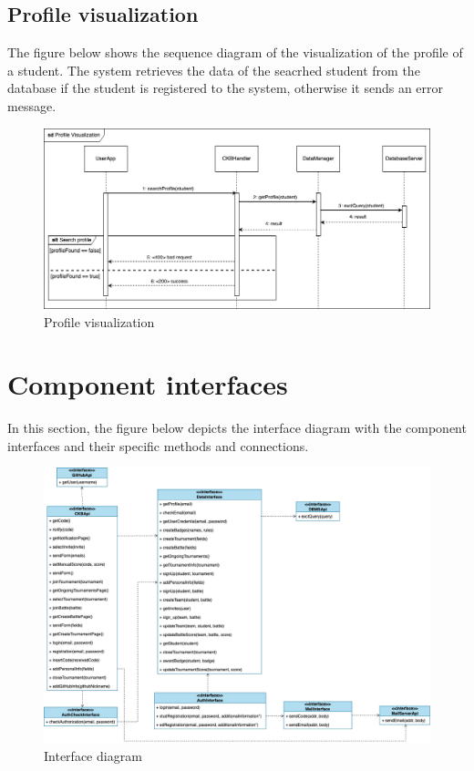 \subsection{Profile visualization}
The figure below shows the sequence diagram of the visualization of the profile of a student. 
The system retrieves the data of the seacrhed student from the database if the student is registered to the system, otherwise it sends an error message.
\begin{figure}[H]
    \centering
    \includegraphics[width=1\textwidth]{images/seq_diagrams/ProfileVis_DD.png}
    \caption{Profile visualization}
\end{figure}
\clearpage

\section{Component interfaces}
In this section, the figure below depicts the interface diagram with the component interfaces and their specific methods and connections.
\begin{figure}[H]
    \centering
    \includegraphics[width=1\textwidth]{images/Interface_diagram.png}
    \caption{Interface diagram}
\end{figure}
\clearpage

